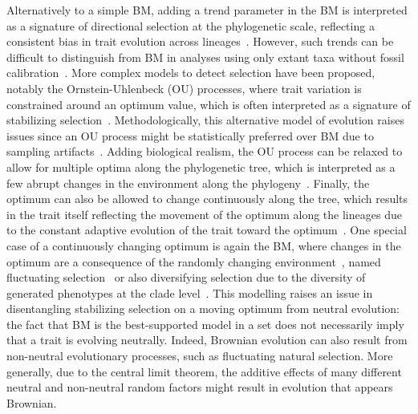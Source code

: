 \documentclass{article}
\begin{document}
Alternatively to a simple BM, adding a trend parameter in the BM is interpreted as a signature of directional selection at the phylogenetic scale, reflecting a consistent bias in trait evolution across lineages~\citep{silvestro_early_2019}.
However, such trends can be difficult to distinguish from BM in analyses using only extant taxa without fossil calibration~\citep{felsenstein_phylogenies_1988a}.
More complex models to detect selection have been proposed, notably the Ornstein-Uhlenbeck (OU) processes, where trait variation is constrained around an optimum value, which is often interpreted as a signature of stabilizing selection~\citep{hansen_stabilizing_1997, butler_phylogenetic_2004, beaulieu_modeling_2012}.
Methodologically, this alternative model of evolution raises issues since an OU process might be statistically preferred over BM due to sampling artifacts~\citep{silvestro_measurement_2015, cooper_cautionary_2016, price_detecting_2022}.
Adding biological realism, the OU process can be relaxed to allow for multiple optima along the phylogenetic tree, which is interpreted as a few abrupt changes in the environment along the phylogeny~\citep{ingram_surface_2013, uyeda_novel_2014, khabbazian_fast_2016, mitov_fast_2020, grabowski_cautionary_2023}.
Finally, the optimum can also be allowed to change continuously along the tree, which results in the trait itself reflecting the movement of the optimum along the lineages due to the constant adaptive evolution of the trait toward the optimum~\citep{hansen_translating_1996, hansen_three_2024}.
One special case of a continuously changing optimum is again the BM, where changes in the optimum are a consequence of the randomly changing environment~\citep{hansen_comparative_2008}, named fluctuating selection~\citep{holstad_evolvability_2024} or also diversifying selection due to the diversity of generated phenotypes at the clade level~\citep{latrille_detecting_2024}.
This modelling raises an issue in disentangling stabilizing selection on a moving optimum from neutral evolution: the fact that BM is the best-supported model in a set does not necessarily imply that a trait is evolving neutrally.
Indeed, Brownian evolution can also result from non-neutral evolutionary processes, such as fluctuating natural selection.
More generally, due to the central limit theorem, the additive effects of many different neutral and non-neutral random factors might result in evolution that appears Brownian.
\end{document}

